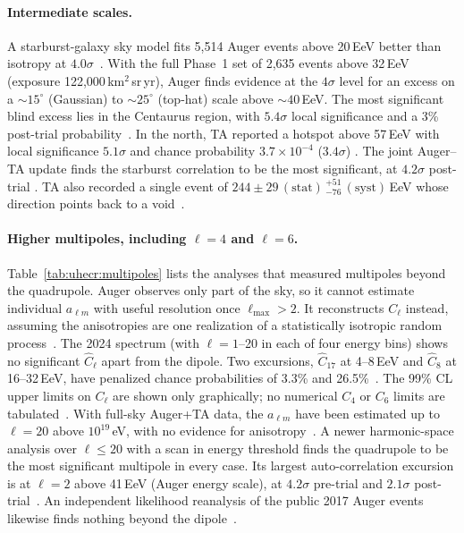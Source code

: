 \paragraph{Intermediate scales.}
A starburst-galaxy sky model fits 5{,}514 Auger events above 20\,EeV better than
isotropy at $4.0\sigma$~\cite{PierreAuger2018indication}. With the full Phase~1
set of 2{,}635 events above 32\,EeV (exposure 122{,}000\,km$^2$\,sr\,yr), Auger
finds evidence at the $4\sigma$ level for an excess on a $\sim15^\circ$
(Gaussian) to $\sim25^\circ$ (top-hat) scale above $\sim40$\,EeV. The most
significant blind excess lies in the Centaurus region, with $5.4\sigma$ local
significance and a 3\% post-trial probability~\cite{PierreAuger2022arrival}. In
the north, TA reported a hotspot above 57\,EeV with local significance
$5.1\sigma$ and chance probability $3.7\times10^{-4}$ ($3.4\sigma$)
\cite{TelescopeArray2014indications}. The joint Auger--TA update finds the
starburst correlation to be the most significant, at $4.2\sigma$ post-trial
\cite{PierreAugerTA2025new}. TA also recorded a single event of
$244\pm29\,(\mathrm{stat})\,^{+51}_{-76}\,(\mathrm{syst})$\,EeV whose direction
points back to a void~\cite{TelescopeArray2023extremely}.

\paragraph{Higher multipoles, including $\ell=4$ and $\ell=6$.}
Table~\ref{tab:uhecr:multipoles} lists the analyses that measured multipoles
beyond the quadrupole. Auger observes only part of the sky, so it cannot
estimate individual $a_{\ell m}$ with useful resolution once $\ell_{\max}>2$.
It reconstructs $C_\ell$ instead, assuming the anisotropies are one
realization of a statistically isotropic random
process~\cite{PierreAuger2024large,PierreAuger2017multiresolution}. The 2024
spectrum (with $\ell=1$--20 in each of four energy bins) shows no significant
$\hat C_\ell$ apart from the dipole. Two excursions, $\hat C_{17}$ at 4--8\,EeV
and $\hat C_8$ at 16--32\,EeV, have penalized chance probabilities of 3.3\% and
26.5\%~\cite{PierreAuger2024large}. The 99\% CL upper limits on $C_\ell$ are
shown only graphically; no numerical $C_4$ or $C_6$ limits are
tabulated~\cite{PierreAuger2024large}. With full-sky Auger+TA data, the
$a_{\ell m}$ have been estimated up to $\ell=20$ above $10^{19}$\,eV, with no
evidence for anisotropy~\cite{PierreAugerTA2014searches}. A newer harmonic-space
analysis over $\ell\le20$ with a scan in energy threshold finds the quadrupole
to be the most significant multipole in every case. Its largest
auto-correlation excursion is at $\ell=2$ above 41\,EeV (Auger energy scale),
at $4.2\sigma$ pre-trial and $2.1\sigma$ post-trial~\cite{PierreAugerTA2025new}.
An independent likelihood reanalysis of the public 2017 Auger events likewise
finds nothing beyond the dipole~\cite{Ahlers2018searching}.

